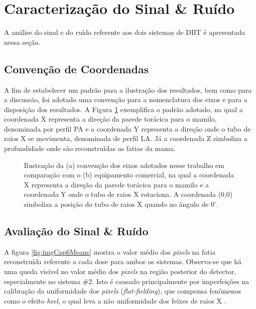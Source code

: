 \clearpage


\section{Caracterização do Sinal  \& Ruído} 

A análise do sinal e do ruído referente aos dois sistemas de \acs{DBT} é apresentada nessa seção. 

\subsection{Convenção de Coordenadas}

A fim de estabelecer um padrão para a ilustração dos resultados, bem como para a discussão, foi adotado uma convenção para a nomenclatura dos eixos e para a disposição dos resultados. A Figura \ref{fig:imgCap63DVolume} exemplifica o padrão adotado, na qual a coordenada X representa a direção da parede torácica para o mamilo, denominada por perfil \ac{PA} e a coordenada Y representa a direção onde o tubo de raios X se movimenta, denominada de perfil \ac{LA}. Já a coordenada Z simboliza a profundidade onde são reconstruídas as fatias da mama.

\begin{figure}[H]
	\centering
	\caption{Ilustração da (a) convenção dos eixos adotados nesse trabalho em comparação com o (b) equipamento comercial, na qual a coordenada X representa a direção da parede torácica para o mamilo e a coordenada Y onde o tubo de raios X rotaciona. A coordenada (0,0) simboliza a posição do tubo de raios X quando no ângulo de $0^{\circ}$.}
	\hfil
	\label{fig:imgCap63DVolume}
\end{figure} 

\subsection{Avaliação do Sinal  \& Ruído}


A figura \ref{fig:imgCap6Means} mostra o valor médio dos \textit{pixels} na fatia reconstruída referente a cada dose para ambos os sistemas. Observa-se que há uma queda visível no valor médio dos \textit{pixels} na região posterior do detector, especialmente no sistema \#2. Isto é causado principalmente por imperfeições na calibração da uniformidade dos \textit{pixels} (\textit{flat-fielding}), que compensa fenômenos como o efeito \textit{heel}, o qual leva a não uniformidade dos feixes de raios X \cite[p. 485]{marshall2017handbook}.


